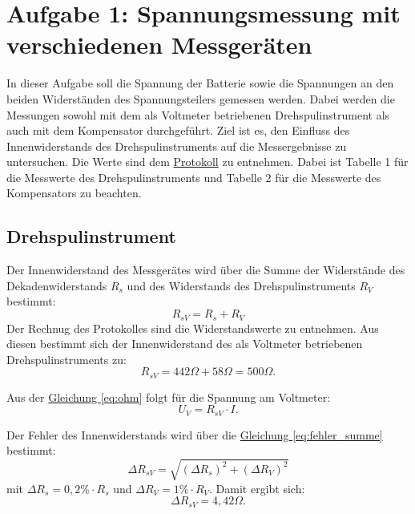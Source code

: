 \twocolumn


\section{Aufgabe 1: Spannungsmessung mit verschiedenen Messgeräten}
In dieser Aufgabe soll die Spannung der Batterie sowie die Spannungen an den beiden Widerständen des Spannungsteilers gemessen werden. Dabei werden die Messungen sowohl mit dem als Voltmeter betriebenen Drehspulinstrument als auch mit dem Kompensator durchgeführt. Ziel ist es, den Einfluss des Innenwiderstands des Drehspulinstruments auf die Messergebnisse zu untersuchen. 
Die Werte sind dem \hyperref[Protokoll]{Protokoll} zu entnehmen. Dabei ist Tabelle 1 für die Messwerte des Drehspulinstruments und Tabelle 2 für die Messwerte des Kompensators zu beachten.

\subsection*{Drehspulinstrument}
Der Innenwiderstand des Messgerätes wird über die Summe der Widerstände des Dekadenwiderstands $R_s$ und des Widerstands des Drehspulinstruments $R_V$ bestimmt:
\begin{equation}   
    R_{sV} = R_s + R_V
    \label{eq:innenwiderstand_voltmeter}
\end{equation}
Der Rechnug des Protokolles sind die Widerstandswerte zu entnehmen. Aus diesen bestimmt sich der Innenwiderstand des als Voltmeter betriebenen Drehspulinstruments zu:
\begin{equation}
    R_{sV} = 442\Omega + 58\Omega = 500\Omega.
\end{equation}

Aus der \hyperref[eq:ohm]{Gleichung \ref*{eq:ohm}} folgt für die Spannung am Voltmeter:
\begin{equation}
    U_V = R_{sV} \cdot I.
    \label{eq:spannung_voltmeter}
\end{equation}

Der Fehler des Innenwiderstands wird über die \hyperref[eq:fehler_summe]{Gleichung \ref*{eq:fehler_summe}} bestimmt:
\begin{equation}
    \Delta R_{sV} = \sqrt{( \Delta R_s )^2 + ( \Delta R_V )^2}
\end{equation}
mit $\Delta R_s = 0,2\% \cdot R_s$ und $\Delta R_{V} = 1\% \cdot R_V$. Damit ergibt sich:
\begin{equation}
    \Delta R_{sV} = 4,42\Omega.
\end{equation}

